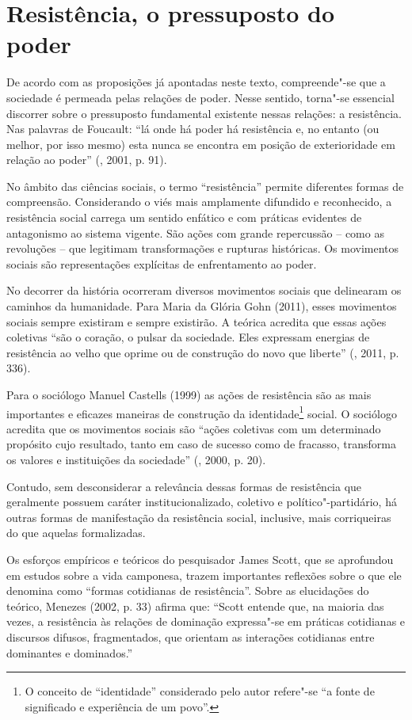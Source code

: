 \section{Resistência, o pressuposto do poder}

De acordo com as proposições já apontadas neste texto, compreende"-se que
a sociedade é permeada pelas relações de poder. Nesse sentido, torna"-se
essencial discorrer sobre o pressuposto fundamental existente nessas
relações: a resistência. Nas palavras de Foucault: ``lá onde há poder há
resistência e, no entanto (ou melhor, por isso mesmo) esta nunca se
encontra em posição de exterioridade em relação ao poder'' (,
2001, p. 91).

No âmbito das ciências sociais, o termo ``resistência'' permite
diferentes formas de compreensão. Considerando o viés mais amplamente
difundido e reconhecido, a resistência social carrega um sentido
enfático e com práticas evidentes de antagonismo ao sistema vigente. São
ações com grande repercussão -- como as revoluções -- que legitimam
transformações e rupturas históricas. Os movimentos sociais são
representações explícitas de enfrentamento ao poder.

No decorrer da história ocorreram diversos movimentos sociais que
delinearam os caminhos da humanidade. Para Maria da Glória Gohn (2011),
esses movimentos sociais sempre existiram e sempre existirão. A teórica
acredita que essas ações coletivas ``são o coração, o pulsar da
sociedade. Eles expressam energias de resistência ao velho que oprime ou
de construção do novo que liberte'' (, 2011, p. 336).

Para o sociólogo Manuel Castells (1999) as ações de resistência são as
mais importantes e eficazes maneiras de construção da
identidade\footnote{O conceito de ``identidade'' considerado pelo autor
  refere"-se ``a fonte de significado e experiência de um povo''.} social.
O sociólogo acredita que os movimentos sociais são ``ações coletivas com
um determinado propósito cujo resultado, tanto em caso de sucesso como
de fracasso, transforma os valores e instituições da sociedade''
(, 2000, p. 20).

Contudo, sem desconsiderar a relevância dessas formas de resistência que
geralmente possuem caráter institucionalizado, coletivo e
político"-partidário, há outras formas de manifestação da resistência
social, inclusive, mais corriqueiras do que aquelas formalizadas.

Os esforços empíricos e teóricos do pesquisador James Scott, que se
aprofundou em estudos sobre a vida camponesa, trazem importantes
reflexões sobre o que ele denomina como ``formas cotidianas de
resistência''. Sobre as elucidações do teórico, Menezes (2002, p. 33)
afirma que: ``Scott entende que, na maioria das vezes, a resistência às
relações de dominação expressa"-se em práticas cotidianas e discursos
difusos, fragmentados, que orientam as interações cotidianas entre
dominantes e dominados.''

